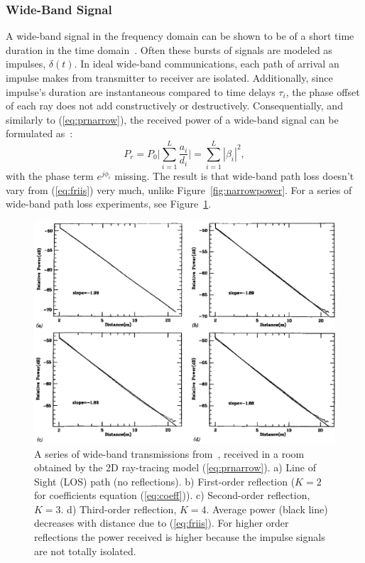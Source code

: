 \subsubsection{Wide-Band Signal}
A wide-band signal in the frequency domain can be shown to be of a short time duration in the time domain~\cite{rappaport1996wireless}. Often these bursts of signals are modeled as impulses, $\delta (t)$. In ideal wide-band communications, each path of arrival an impulse makes from transmitter to receiver are isolated. Additionally, since impulse's duration are instantaneous compared to time delays $\tau_i$, the phase offset of each ray does not add constructively or destructively. Consequentially, and similarly to (\ref{eq:prnarrow}), the received power of a wide-band signal can be formulated as~\cite{pahlavan2005wireless}:
\begin{equation}
\label{eq:prwide}
P_r = P_0 \Bigg| \sum_{i=1}^L \frac{a_i}{d_i} \Bigg| = \sum_{i=1}^L |\beta_i|^2,
\end{equation}
with the phase term $e^{j\phi_i}$ missing. The result is that wide-band path loss doesn't vary from (\ref{eq:friis}) very much, unlike Figure~\ref{fig:narrowpower}. For a series of wide-band path loss experiments, see Figure~\ref{fig:widepower}.
\FloatBarrier
\begin{figure}[ht!]
	\centering	\includegraphics[width=1\textwidth,keepaspectratio]{figs/widebandpower.png}
    \caption{A series of wide-band transmissions from~\cite{pahlavan2005wireless}, received in a room obtained by the 2D ray-tracing model (\ref{eq:prnarrow}). a) Line of Sight (LOS) path (no reflections). b) First-order reflection ($K=2$ for coefficients equation (\ref{eq:coeff})). c) Second-order reflection, $K=3$. d) Third-order reflection, $K=4$. Average power (black line) decreases with distance due to (\ref{eq:friis}). For higher order reflections the power received is higher because the impulse signals are not totally isolated.} 
\label{fig:widepower}      
\end{figure}
\FloatBarrier

